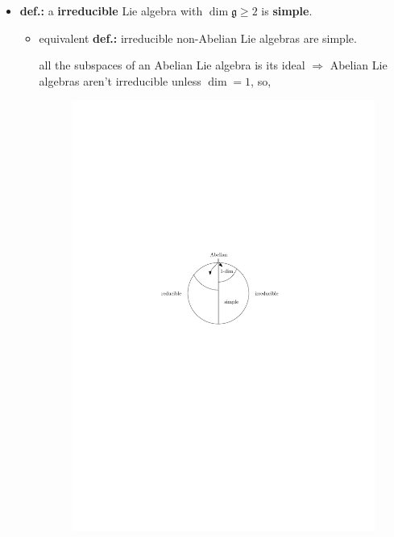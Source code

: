 \begin{itemize}
	\item \textbf{def.:} a \textbf{irreducible} Lie algebra with $\dim \mathfrak{g} \geq 2$ is \textbf{simple}.
	\begin{itemize}
		\item equivalent \textbf{def.:} irreducible non-Abelian Lie algebras are simple.
		
		\begin{tcolorbox}[title=proof:]
			all the subspaces of an Abelian Lie algebra is its ideal $\Longrightarrow$ Abelian Lie algebras aren't irreducible unless $\dim = 1$, so,
			
			\begin{figure}[H]
				\centering
				\includegraphics[scale=1]{figures/(non-)Abelian, (ir)reducible, and simple.pdf}
			\end{figure}
		\end{tcolorbox}
	\end{itemize}
	

\end{itemize}
